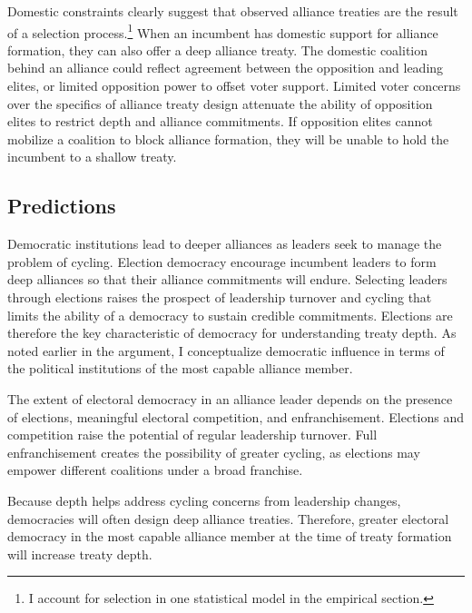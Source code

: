 \documentclass[12pt]{article}
\begin{document}
Domestic constraints clearly suggest that observed alliance treaties are the result of a selection process.\footnote{I account for selection in one statistical model in the empirical section.} 
When an incumbent has domestic support for alliance formation, they can also offer a deep alliance treaty. 
The domestic coalition behind an alliance could reflect agreement between the opposition and leading elites, or limited opposition power to offset voter support. 
Limited voter concerns over the specifics of alliance treaty design attenuate the ability of opposition elites to restrict depth and alliance commitments.
If opposition elites cannot mobilize a coalition to block alliance formation, they will be unable to hold the incumbent to a shallow treaty. 



\subsection{Predictions}

Democratic institutions lead to deeper alliances as leaders seek to manage the problem of cycling. 
Election democracy encourage incumbent leaders to form deep alliances so that their alliance commitments will endure.
Selecting leaders through elections raises the prospect of leadership turnover and cycling that limits the ability of a democracy to sustain credible commitments. 
Elections are therefore the key characteristic of democracy for understanding treaty depth. 
As noted earlier in the argument, I conceptualize democratic influence in terms of the political institutions of the most capable alliance member.


The extent of electoral democracy in an alliance leader depends on the presence of elections, meaningful electoral competition, and enfranchisement. 
Elections and competition raise the potential of regular leadership turnover. 
Full enfranchisement creates the possibility of greater cycling, as elections may empower different coalitions under a broad franchise. 


Because depth helps address cycling concerns from leadership changes, democracies will often design deep alliance treaties. 
Therefore, greater electoral democracy in the most capable alliance member at the time of treaty formation will increase treaty depth. 
\end{document}
